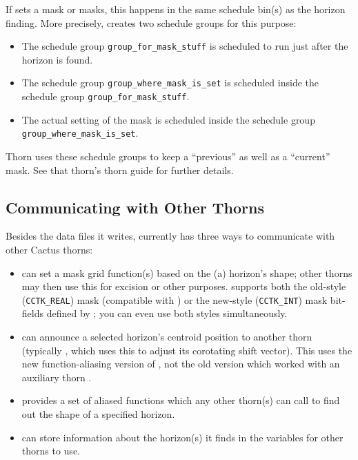 If  sets a mask or masks, this happens in the
same schedule bin(s) as the horizon finding.  More precisely,
 creates two schedule groups for this purpose:
\begin{itemize}
\item	The schedule group \verb|group_for_mask_stuff| is
	scheduled to run just after the horizon is found.
\item	The schedule group \verb|group_where_mask_is_set|
	is scheduled inside the schedule group \verb|group_for_mask_stuff|.
\item	The actual setting of the mask is scheduled inside
	the schedule group \verb|group_where_mask_is_set|.
\end{itemize}
Thorn  uses these schedule groups to keep a
``previous'' as well as a ``current'' mask.  See that thorn's thorn
guide for further details.


\subsection{Communicating with Other Thorns}
\label{AHFinderDirect/sect-parameters/communicating-with-other-thorns}

Besides the data files it writes,  currently
has three ways to communicate with other Cactus thorns:
\begin{itemize}
\item	{} can set a mask grid function(s) based
	on the (a) horizon's shape; other thorns may then use this for
	excision or other purposes.   supports
	both the old-style (\verb|CCTK_REAL|) mask
	(compatible with ) or
	the new-style (\verb|CCTK_INT|) mask bit-fields defined by
	; you can even use both styles simultaneously.
\item	{} can announce a selected horizon's centroid
	position to another thorn (typically , which
	uses this to adjust its corotating shift vector).
	This uses the new function-aliasing version of ,
	not the old version which worked with an auxiliary thorn
	.
\item	{} provides a set of aliased functions
	which any other thorn(s) can call to find out the shape of
	a specified horizon.
\item	{} can store information about the
	horizon(s) it finds in the  variables
	for other thorns to use.
\end{itemize}

